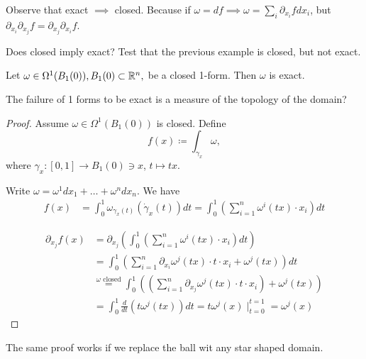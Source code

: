 Observe that exact \(\implies\) closed. Because if \(\omega=df\implies \omega=\sum_{i}\partial_{x_i}fdx_i\), but \(\partial_{x_i}\partial_{x_j}f=\partial_{x_j}\partial_{x_i}f\).


 Does closed imply exact?  Test that the previous example is closed, 
but not exact.

\begin{proposition}\label{prop:10.5}
    Let \(\omega\in\Omega^1(B_1(0)),B_1(0)\subset\mathbb{R}^n,\) be a closed 1-form. Then \(\omega\) is exact.    
\end{proposition}

\begin{remark}
    The failure of 1 forms to be exact is a measure of the topology of the domain? %
\end{remark}

\begin{proof}
    Assume \(\omega\in \Omega^1(B_1(0))\) is closed. Define \[f(x)\coloneqq\int_{\gamma_x}\omega,\]
    where \(\gamma_x:[0,1]\to B_1(0)\ni x\), \(t\mapsto tx\).

    Write \(\omega=\omega^1dx_1+\dots+\omega^n dx_n\). We have 
    \begin{align*}
        f(x)&=\int_0^1 \omega_{\gamma_x(t)}\left(\dot{\gamma}_x(t)\right)dt = \int_0^1\left(\sum_{i=1}^n \omega^i(tx)\cdot x_i\right)dt 
    \end{align*}

    \begin{align*}
        \partial_{x_j}f(x)&=\partial_{x_j}\left(\int_0^1\left(\sum_{i=1}^n \omega^i(tx)\cdot x_i\right)dt\right)\\
        &= \int_0^1\left(\sum_{i=1}^n \partial_{x_i}\omega^j(tx)\cdot t\cdot x_i+\omega^j(tx)\right)dt\\
        &\stackrel{\omega \text{ closed}}{=} \int_0^1\left(\left(\sum_{i=1}^n \partial_{x_j} \omega^j(tx)\cdot t \cdot x_i\right)+\omega^j(tx)\right)\\
        &=\int_0^1\frac{d}{dt}(t \omega^j(tx))dt=t\omega^j(x)\mid_{t=0}^{t=1}=\omega^j(x)
    \end{align*}
\end{proof}

\begin{remark}
    The same proof works if we replace the ball wit any star shaped domain.
\end{remark}

